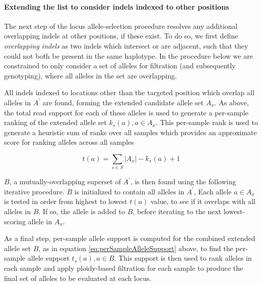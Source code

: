 \documentclass{article}
\newcommand{\setSize}[1]{\ensuremath{\lvert{#1}\rvert}}
\begin{document}
\paragraph{Extending the list to consider indels indexed to other positions}

The next step of the locus allele-selection procedure resolves any additional overlapping indels at other positions, if these exist. To do so, we first define \emph{overlapping indels} as two indels which intersect or are adjacent, such that they could not both be present in the same haplotype. In the procedure below we are constrained to only consider a set of alleles for filtration (and subsequently genotyping), where all alleles in the set are overlapping.

All indels indexed to locations other than the targeted position which overlap all alleles in $A^{\prime}$ are found, forming the extended candidate allele set $A_x$. As above, the total read support for each of these alleles is used to generate a per-sample ranking of the extended allele set $k_s(a), a \in A_x$. This per-sample rank is used to generate a heuristic sum of ranks over all samples which provides an approximate score for ranking alleles across all samples

\begin{equation*}
t(a) = \sum_{s \in S}{\setSize{A_x} - k_s(a) + 1}
\end{equation*}

$B$, a mutually-overlapping superset of $A^{\prime}$, is then found using the following iterative procedure. $B$ is initialized to contain all alleles in $A^{\prime}$, Each allele $a \in A_x$ is tested in order from highest to lowest $t(a)$ value, to see if it overlaps with all alleles in $B$. If so, the allele is added to $B$, before iterating to the next lowest-scoring allele in $A_x$.

As a final step, per-sample allele support is computed for the combined extended allele set $B$, as in equation \ref{eq:perSampleAlleleSupport} above, to find the per-sample allele support $t_s(a), a \in B$. This support is then used to rank alleles in each sample and apply ploidy-based filtration for each sample to produce the final set of alleles to be evaluated at each locus.

\end{document}
